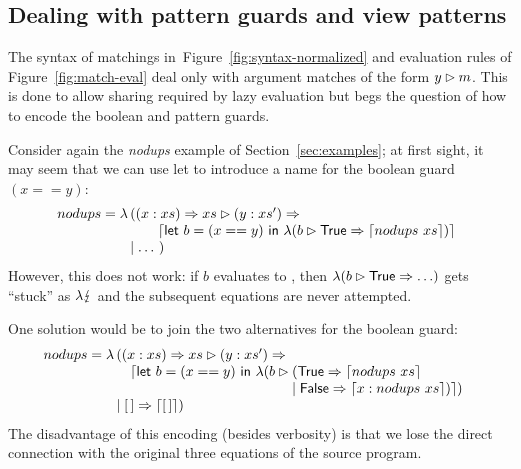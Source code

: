 \subsection{Dealing with pattern guards and view patterns}\label{sec:pattern-guards}

The syntax of matchings in~Figure~\ref{fig:syntax-normalized} and
evaluation rules of Figure~\ref{fig:match-eval} deal only with
argument matches of the form $y\rhd m$.  This is done to
allow sharing required by lazy evaluation but begs the question
of how to encode the boolean and pattern guards. 

Consider again the \textit{nodups} example of
Section~\ref{sec:examples}; at first sight, it may seem that we can
use let to introduce a name for the boolean guard $(x==y)$:
\[
  nodups = \lambda \!\!\begin{array}[t]{l}
    ((x:xs) \Rightarrow xs \rhd (y:xs') \Rightarrow \\
     \qquad \left\lceil \textsf{let}~ b = (x==y)~ \textsf{in}~
             \lambda(b \rhd \textsf{True} \Rightarrow \left\lceil nodups~ xs\right\rceil)\right\rceil  \\
                         \mid \ldots~)
                       \end{array}
\]
However, this does not work: if $b$ evaluates to ,
then $\lambda(b \rhd \textsf{True} \Rightarrow \ldots)$ gets ``stuck''
as $\lambda \lightning$ and the subsequent equations are never attempted.

One solution would be to join the two alternatives for the boolean guard:
\[
  nodups = \lambda \!\!\begin{array}[t]{l}
    ((x:xs) \Rightarrow xs \rhd (y:xs') \Rightarrow \\
     \quad \lceil\textsf{let}~ b = (x==y)~ \textsf{in}~
                         \lambda(b \rhd \!\!\!\begin{array}[t]{l}
                                                (\textsf{True} \Rightarrow \left\lceil nodups~ xs\right\rceil \\
                                                \mid \textsf{False} \Rightarrow \left\lceil x:nodups ~ xs\right\rceil)\rceil)\end{array}  \\
                         \mid [\,] \Rightarrow \left\lceil [\,]\right\rceil)
                       \end{array}
\]
The disadvantage of this encoding (besides verbosity) is that we lose
the direct connection with the original three equations of the source
program.

